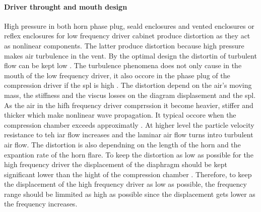 \paragraph{Driver throught and mouth design} High pressure in both horn phase plug, seald enclosures and vented enclosures or reflex enclosures for low frequency driver cabinet produce distortion as they act as nonlinear components. The latter produce distortion because high pressure makes air turbulence in the vent. By the optimal design the distortin of turbulent flow can be kept low \citep{roozen1998reduction}. The turbulence phenomena does not only cause in the mouth of the low frequency driver, it also occore in the phase plug of the compression driver if the \gls{spl} is high \citep{czerwinski1999air}. The distortion depend on the air's moving mass, the stiffness and the viscus losses on the diagram displasement and the \gls{spl}. As the air in the hifh frequency driver comprrssion it become heavier, stiffer and thicker which make nonlinear wave propagation. It typical occore when the compression chamber exceeds approximatly . At higher level the particle velocity resistance to teh iar flow increases and the laminar air flow turns intro turbulent air flow. The distortion is also dependning on the length of the horn and the expantion rate of the horn flare. To keep the distortion as low as possible for the high frequency driver the displacement of the diaphragm should be kept significant lower than the hight of the compression chamber \citep{voishvillo2004comparative}. Therefore, to keep the displacement of the high frequency driver as low as possible, the frequency range should be limmited as high as possible since the displacement gets lower as the frequency increases.



